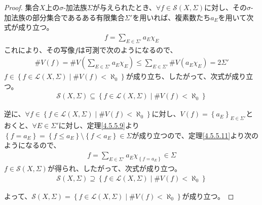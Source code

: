\documentclass[dvipdfmx]{jsarticle}
\begin{document}
\begin{proof}
集合$X$上の$\sigma$-加法族$\varSigma$が与えられたとき、$\forall f \in \mathcal{S}(X,\varSigma)$に対し、その$\sigma$-加法族の部分集合であるある有限集合$\varSigma'$を用いれば、複素数たち$a_{E}$を用いて次式が成り立つ。
\begin{align*}
f = \sum_{E \in \varSigma'} {a_{E}\chi_{E}}
\end{align*}
これにより、その写像$f$は可測で次のようになるので、
\begin{align*}
\#{V(f)} = \#{V\left( \sum_{E \in \varSigma'} {a_{E}\chi_{E}} \right)} \leq \sum_{E \in \varSigma'} {\#{V\left( a_{E}\chi_{E} \right)}} = 2\varSigma'
\end{align*}
$f \in \left\{ f\in \mathcal{L}(X,\varSigma) \middle| \#{V(f)} < \aleph_{0} \right\}$が成り立ち、したがって、次式が成り立つ。
\begin{align*}
\mathcal{S}(X,\varSigma) \subseteq \left\{ f\in \mathcal{L}(X,\varSigma) \middle| \#{V(f)} < \aleph_{0} \right\}
\end{align*}\par
逆に、$\forall f \in \left\{ f\in \mathcal{L}(X,\varSigma) \middle| \#{V(f)} < \aleph_{0} \right\}$に対し、$V(f) = \left\{ a_{E} \right\}_{E \in \varSigma'}$とおくと、$\forall E \in \varSigma'$に対し、定理\ref{4.5.5.9}より$\left\{ f = a_{E} \right\} = \left\{ f \leq a_{E} \right\} \setminus \left\{ f < a_{E} \right\} \in \varSigma$が成り立つので、定理\ref{4.5.5.11}より次のようになるので、
\begin{align*}
f = \sum_{E \in \varSigma'} {a_{E}\chi_{\left\{ f = a_{E} \right\}}} \in \varSigma
\end{align*}
$f \in \mathcal{S}(X,\varSigma)$が得られ、したがって、次式が成り立つ。
\begin{align*}
\mathcal{S}(X,\varSigma) \supseteq \left\{ f\in \mathcal{L}(X,\varSigma) \middle| \#{V(f)} < \aleph_{0} \right\}
\end{align*}\par
よって、$\mathcal{S}(X,\varSigma) = \left\{ f\in \mathcal{L}(X,\varSigma) \middle| \#{V(f)} < \aleph_{0} \right\}$が成り立つ。
\end{proof}
\end{document}
